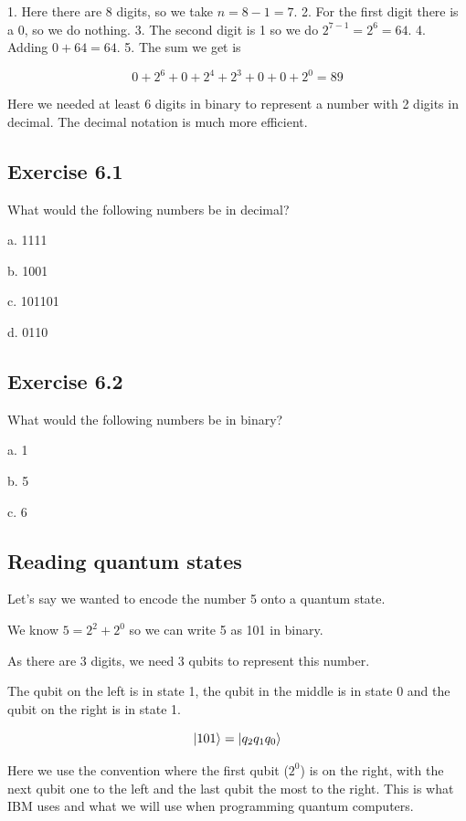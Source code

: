 \documentclass{book}
\begin{document}
1. Here there are 8 digits, so we take $n = 8 - 1 = 7 $. 
2. For the first digit there is a 0, so we do nothing. 
3. The second digit is 1 so we do $2^{7-1} = 2^6 = 64$. 
4. Adding $0 + 64 = 64$.
5. The sum we get is

$$
0 + 2^6 +0  + 2^4 + 2^3+ 0 + 0 + 2^0 = 89 
$$

Here we needed at least 6 digits in binary to represent a number with 2 digits in decimal. The decimal notation is much more efficient. \newline

\hline

\subsection{Exercise 6.1}

What would the following numbers be in decimal?

a. 1111

b. 1001

c. 101101

d. 0110

\subsection{Exercise 6.2}

What would the following numbers be in binary? 

a. 1 

b. 5

c. 6 \newline

\hline
\subsection{ Reading quantum states }

Let's say we wanted to encode the number 5 onto a quantum state. 

We know $ 5 = 2^2 + 2^0$ so we can write 5 as 101 in binary. 

As there are 3 digits, we need 3 qubits to represent this number. 

The qubit on the left is in state 1, the qubit in the middle is in state 0 and the qubit on the right is in state 1. 

$$ \ket{101} = \ket{q_2q_1q_0} $$

Here we use the convention where the first qubit ($2^0$) is on the right, with the next qubit one to the left and the last qubit the most to the right. This is what IBM uses and what we will use when programming quantum computers.
\end{document}
